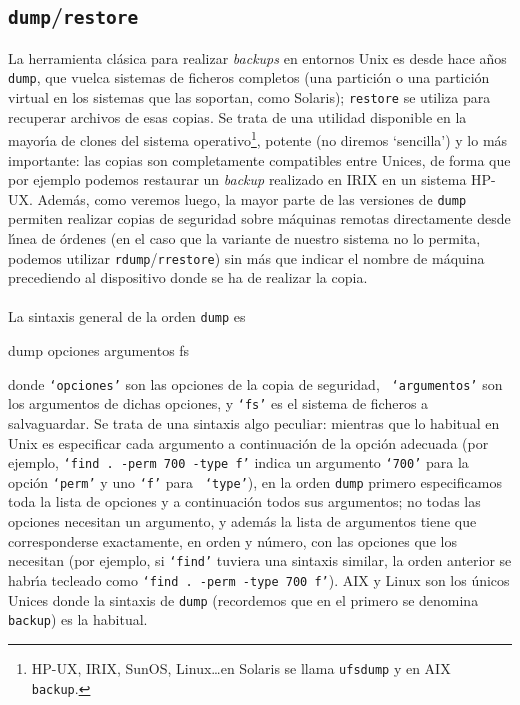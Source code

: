 \subsection{{\tt dump}/{\tt restore}}
La herramienta cl\'asica para realizar {\it backups} en entornos Unix es desde
hace a\~nos {\tt dump}, que vuelca sistemas de ficheros completos (una 
partici\'on o una partici\'on virtual en los sistemas que las soportan, como
Solaris); {\tt restore} se utiliza para recuperar archivos de
esas copias. Se trata de una utilidad disponible en la mayor\'{\i}a de clones
del sistema operativo\footnote{HP-UX, IRIX, SunOS, Linux\ldots en Solaris se 
llama {\tt ufsdump} y en AIX {\tt backup}.}, potente (no diremos `sencilla') y 
lo m\'as importante: las 
copias son completamente compatibles entre Unices, de forma que por ejemplo 
podemos restaurar un {\it backup} realizado en IRIX en un sistema HP-UX. 
Adem\'as, como veremos luego, la mayor parte de las versiones de {\tt dump} 
permiten realizar copias
de seguridad sobre m\'aquinas remotas directamente desde l\'{\i}nea de \'ordenes
(en el caso que la variante de nuestro sistema no lo permita, podemos utilizar
{\tt rdump}/{\tt rrestore}) sin m\'as que indicar el nombre de m\'aquina 
precediendo al dispositivo donde se ha de realizar la copia.\\
\\La sintaxis general de la orden {\tt dump} es
\tt
\begin{center}
dump opciones argumentos fs
\end{center}
\rm
donde {\tt `opciones'} son las opciones de la copia de seguridad, {\tt 
`argumentos'} son los argumentos de dichas opciones, y {\tt `fs'} es el sistema 
de ficheros a salvaguardar. Se trata de una sintaxis algo peculiar: mientras
que lo habitual en Unix es especificar cada argumento a continuaci\'on de
la opci\'on adecuada (por ejemplo, {\tt `find . -perm 700 -type f'} indica un
argumento {\tt `700'} para la opci\'on {\tt `perm'} y uno {\tt `f'} para {\tt
`type'}), en la orden {\tt dump} primero especificamos toda la lista de
opciones y a continuaci\'on todos sus argumentos; no todas las opciones 
necesitan un argumento, y adem\'as la lista de argumentos tiene que
corresponderse exactamente, en orden y n\'umero, con las opciones que los
necesitan (por ejemplo, si {\tt `find'} tuviera una sintaxis similar, la orden 
anterior se habr\'{\i}a tecleado como {\tt `find . -perm -type 700 f'}). AIX
y Linux son los \'unicos Unices donde la sintaxis de {\tt dump} (recordemos que en el primero se denomina {\tt backup}) es la habitual.\\
